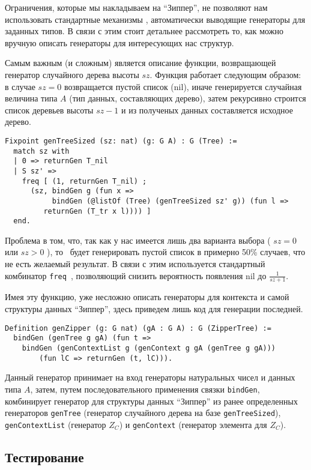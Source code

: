 Ограничения, которые мы накладываем на ``Зиппер'', не позволяют нам использовать стандартные механизмы \tqc, автоматически выводящие генераторы для заданных типов. В связи с этим стоит детальнее рассмотреть то, как можно вручную описать генераторы для интересующих нас структур.

Самым важным (и сложным) является описание функции, возвращающей генератор случайного дерева высоты $sz$. Функция работает следующим образом: в случае $sz  = 0$ возвращается пустой список (nil), иначе генерируется случайная величина типа $A$ (тип данных, составляющих дерево), затем рекурсивно строится список деревьев высоты $sz - 1$ и из полученых данных составляется исходное дерево.

\begin{Verbatim}[fontsize=\small]
Fixpoint genTreeSized (sz: nat) (g: G A) : G (Tree) :=
  match sz with
  | 0 => returnGen T_nil
  | S sz' =>
    freq [ (1, returnGen T_nil) ;
      (sz, bindGen g (fun x =>
           bindGen (@listOf (Tree) (genTreeSized sz' g)) (fun l =>
         returnGen (T_tr x l)))) ]
  end.
\end{Verbatim}

Проблема в том, что, так как у нас имеется лишь два варианта выбора ( $sz = 0$ или $sz > 0$ ), то \tqc~будет генерировать пустой список в примерно 50\% случаев, что не есть желаемый результат. В связи с этим используется стандартный комбинатор \texttt{freq}~\autocite{QuickChickRM}, позволяющий снизить вероятность появления nil до $\frac{1}{sz + 1}$.

Имея эту функцию, уже несложно описать генераторы для контекста и самой структуры данных ``Зиппер'', здесь приведем лишь код для генерации последней.
\begin{Verbatim}[fontsize=\small]
Definition genZipper (g: G nat) (gA : G A) : G (ZipperTree) :=
  bindGen (genTree g gA) (fun t =>
    bindGen (genContextList g (genContext g gA (genTree g gA)))
    	(fun lC => returnGen (t, lC))).
\end{Verbatim}

Данный генератор принимает на вход генераторы натуральных чисел и данных типа $A$, затем, путем последовательного применения связки \texttt{bindGen}, комбинирует генератор для структуры данных ``Зиппер'' из ранее определенных генераторов \texttt{genTree} (генератор случайного дерева на базе \texttt{genTreeSized}), \texttt{genContextList} (генератор $Z_C$) и \texttt{genContext} (генератор элемента для $Z_C$).

\subsection{Тестирование}

